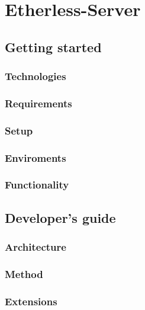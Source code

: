 \section{Etherless-Server}
	
	\subsection{Getting started}
	
		\subsubsection{Technologies} %
		
		\subsubsection{Requirements} %
		
		\subsubsection{Setup} %
		
		\subsubsection{Enviroments} %
		
		\subsubsection{Functionality} %
	
	
	\subsection{Developer's guide}
	
		\subsubsection{Architecture} %
		
		\subsubsection{Method} %
		
		\subsubsection{Extensions}  %